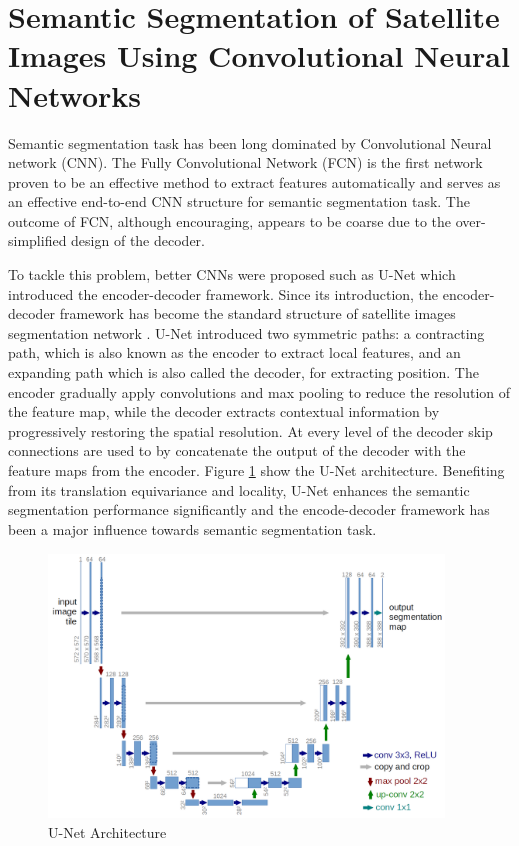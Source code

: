 \section{Semantic Segmentation of Satellite Images Using Convolutional Neural Networks}

Semantic segmentation task has been long dominated by Convolutional Neural network (CNN). The Fully Convolutional Network (FCN) \cite{7298965} is the first network proven to be an effective method to extract features automatically and serves as an effective end-to-end CNN structure for semantic segmentation task. The outcome of FCN, although encouraging, appears to be coarse due to the over-simplified design of the decoder.

To tackle this problem, better CNNs were proposed such as U-Net \cite{unet} which  introduced the encoder-decoder framework. Since its introduction, the encoder-decoder framework has become the standard structure of satellite images segmentation network \cite{unetformer}. U-Net introduced two symmetric paths: a contracting path, which is also known as the encoder to extract local features, and an expanding path which is also called the decoder, for extracting position. The encoder gradually apply convolutions and max pooling to reduce the resolution of the feature map, while the decoder extracts contextual information by progressively restoring the spatial resolution. At every level of the decoder skip connections are used to by concatenate the output of the decoder with the feature maps from the encoder. Figure \ref{fig:unet} show the U-Net architecture. Benefiting from its translation equivariance and locality, U-Net enhances the semantic segmentation performance significantly and the encode-decoder framework has been a major influence towards semantic segmentation task. 

\begin{figure}[ht]
\includegraphics[width=10.5cm, height=7cm]{images/unet.png}
\centering
\caption{U-Net Architecture}
\label{fig:unet}
\end{figure}

